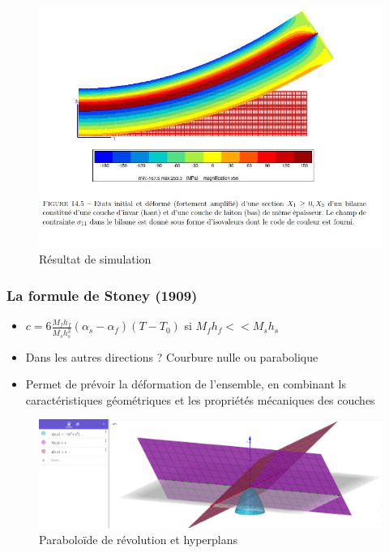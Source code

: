 \documentclass{beamer}
\begin{document}
\begin{frame}
    \begin{figure}
        \centering
        \includegraphics[scale=0.2]{imgs/deformation.JPG}
        \caption{Résultat de simulation}
    \end{figure}
    
\end{frame}



\begin{frame}
    \frametitle{La formule de Stoney (1909)}

    \begin{itemize}
        \item $c = 6\frac{M_fh_f}{M_sh_s^2}(\alpha_s-\alpha_f)(T-T_0)$ si $M_fh_f << M_sh_s$ 
        \item Dans les autres directions ? Courbure nulle ou parabolique
        \item Permet de prévoir la déformation de l'ensemble, en combinant ls caractéristiques géométriques et les propriétés mécaniques des couches
    \end{itemize}
    
    \begin{figure}
        \centering
        \includegraphics[scale=0.25]{imgs/courbes.png}
        \caption{Paraboloïde de révolution et hyperplans}
    \end{figure}
    
\end{frame}
\end{document}
